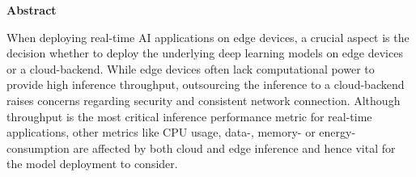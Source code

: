 \vspace*{2cm}

\begin{center}
    \textbf{Abstract}
\end{center}

\vspace*{1cm}

\begin{comment}
\noindent When deploying real-time AI applications, a crucial aspect is the decision whether to deploy the underlying deep learning models on edge devices or on a cloud-backend.
For the model inference various things need to be considered, amongst other things preprocessing, computational demands,
specialised hardware (GPU, TPU, neuromorphic co-processors, FPGA),
network latencies and energy consumption. Most of these aspects depend on both the model as well as the environment where the model is deployed. 
In order to help with the optimal selection of cloud and edge inference to achieve real-time AI, this thesis proposes a performance model characterising the deployment of a deep learning model and the resulting trade-offs.
Based on this performance model, the most essential trade-offs of the different deployment options get demonstrated by conducting multiple experiments using image classification as a use case. After the evaluation of these experiments, recommendations for the deployment are proposed.



-----------------------------------------------------------------------------
\end{comment}




\noindent When deploying real-time AI applications on edge devices, a crucial aspect is the decision whether to deploy the underlying deep learning models on edge devices or a cloud-backend.
While edge devices often lack computational power to provide high inference throughput, outsourcing the inference to a cloud-backend raises concerns regarding security and consistent network connection.
Although throughput is the most critical inference performance metric for real-time applications, other metrics like CPU usage, data-, memory- or energy-consumption are affected by both cloud and edge inference and hence vital for the model deployment to consider.


